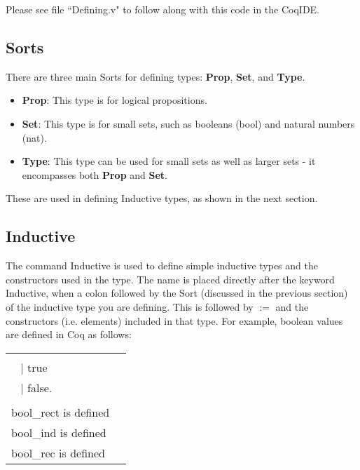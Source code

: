 
Please see file ``Defining.v" to follow along with this code in the CoqIDE. 

\subsection{Sorts} \label{subsec: sort}
There are three main Sorts for defining types: {\bf Prop}, {\bf Set}, and {\bf Type}. 
\begin{itemize}
	\item {\bf Prop}: This type is for logical propositions. 
	\item {\bf Set}: This type is for small sets, such as booleans (bool) and natural numbers (nat). 
	\item {\bf Type}: This type can be used for small sets as well as larger sets - it encompasses both {\bf Prop} and {\bf Set}. 
\end{itemize}

\noindent
These are used in defining Inductive types, as shown in the next section.




\subsection{Inductive} \label{subsec: inductive}
The command Inductive is used to define simple inductive types and the constructors used in the type. 
The name is placed directly after the keyword Inductive, when a colon followed by the Sort 
(discussed in the previous section) of the inductive type you are defining. 
This is followed by $:=$ and the constructors (i.e. elements) included in that type.  
For example, boolean values are defined in Coq as follows:

\hspace{-1cm}
\begin{tabular}{p{8cm} p{8cm}}
	\begin{code}
		\df{Inductive} \nm{bool} : \ty{Set} := 	\\ \-\ \quad
 		 $\mid$ true						\\ \-\ \quad
 		 $\mid$ false.						\\		
	\end{code}
&
	\begin{msg}
		bool is defined			\\
		bool\_rect is defined		\\
		bool\_ind is defined		\\
		bool\_rec is defined
	\end{msg}
\end{tabular}

